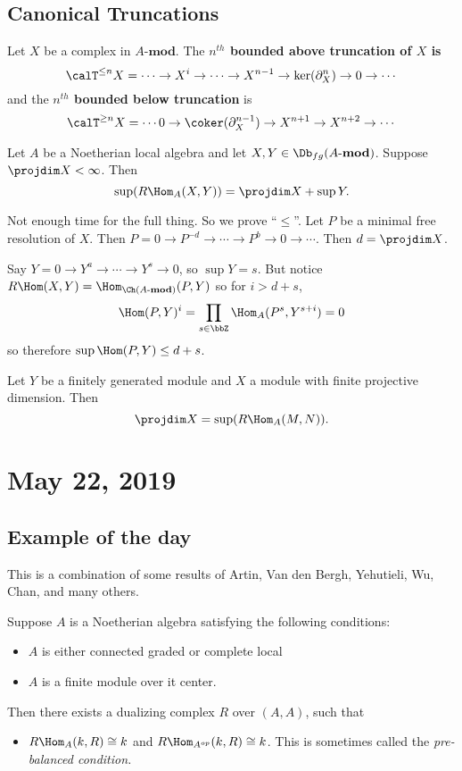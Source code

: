 \documentclass[12pt]{article}
\newcommand*{\Amod}{A\text{-}\mathbf{mod}}
\begin{document}
\subsection{Canonical Truncations}
\begin{defn}
	Let $X$ be a complex in $\Amod$. The \textbf{$n^{th}$ bounded above truncation of $X$ is}
	\[\calT^{\le n}X=\cdots\to X^i\to\cdots\to X^{n-1}\to\ker(\partial_X^n)\to 0\to \cdots\]
	and the \textbf{$n^{th}$ bounded below truncation} is
	\[\calT^{\ge n}X=\cdots 0\to\coker(\partial_X^{n-1})\to X^{n+1}\to X^{n+2}\to\cdots\]
\end{defn}
\begin{thm}
	Let $A$ be a Noetherian local algebra and let $X,Y\in\Db_{fg}(\Amod)$. Suppose $\projdim X<\infty$.
	Then 
	\[\sup(R\Hom_A(X,Y))=\projdim X+\sup Y.\]
\end{thm}
\begin{prf}
	Not enough time for the full thing. So we prove ``$\le$''. Let $P$ be a minimal free resolution of $X$. Then 
	$P=0\to P^{-d}\to\cdots\to P^b\to 0\to\cdots$. Then $d=\projdim X$. 

	Say $Y=0\to Y^a\to\cdots\to Y^s\to 0$, so $\sup Y=s$. But notice $R\Hom(X,Y)=\Hom_{\Ch(\Amod)}(P,Y)$
	so for $i>d+s$,
	\[\Hom(P,Y)^i=\prod_{s\in\bbZ}\Hom_A(P^s,Y^{s+i})=0\]
	so therefore $\sup \Hom(P,Y)\le d+s$.
\end{prf}
\begin{cor}
	Let $Y$ be a finitely generated module and $X$ a module with finite projective dimension. Then 
	\[\projdim X=\sup(R\Hom_A(M,N)).\]
\end{cor}

\section{May 22, 2019}
\subsection{Example of the day}
This is a combination of some results of Artin, Van den Bergh, Yehutieli, Wu, Chan, and many others.

Suppose $A$ is a Noetherian algebra satisfying the following conditions:
\begin{itemize}
	\item $A$ is either connected graded or complete local
	\item $A$ is a finite module over it center.
\end{itemize}
Then there exists a dualizing complex $R$ over $(A,A)$, such that 
\begin{itemize}
	\item $R\Hom_A(k,R)\cong k$ and $R\Hom_{A^{op}}(k,R)\cong k$. This is sometimes called the \textit{pre-balanced condition.}
\end{itemize}
\end{document}
